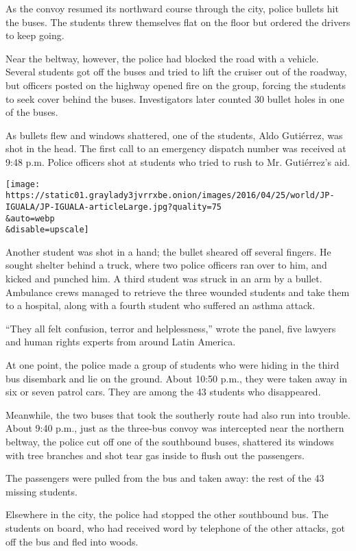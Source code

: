 As the convoy resumed its northward course through the city, police
bullets hit the buses. The students threw themselves flat on the floor
but ordered the drivers to keep going.

Near the beltway, however, the police had blocked the road with a
vehicle. Several students got off the buses and tried to lift the
cruiser out of the roadway, but officers posted on the highway opened
fire on the group, forcing the students to seek cover behind the buses.
Investigators later counted 30 bullet holes in one of the buses.

As bullets flew and windows shattered, one of the students, Aldo
Gutiérrez, was shot in the head. The first call to an emergency dispatch
number was received at 9:48 p.m. Police officers shot at students who
tried to rush to Mr. Gutiérrez's aid.

\texttt{[image: https://static01.graylady3jvrrxbe.onion/images/2016/04/25/world/JP-IGUALA/JP-IGUALA-articleLarge.jpg?quality=75\\\&auto=webp\\\&disable=upscale]}

Another student was shot in a hand; the bullet sheared off several
fingers. He sought shelter behind a truck, where two police officers ran
over to him, and kicked and punched him. A third student was struck in
an arm by a bullet. Ambulance crews managed to retrieve the three
wounded students and take them to a hospital, along with a fourth
student who suffered an asthma attack.

``They all felt confusion, terror and helplessness,'' wrote the panel,
five lawyers and human rights experts from around Latin America.

At one point, the police made a group of students who were hiding in the
third bus disembark and lie on the ground. About 10:50 p.m., they were
taken away in six or seven patrol cars. They are among the 43 students
who disappeared.

Meanwhile, the two buses that took the southerly route had also run into
trouble. About 9:40 p.m., just as the three-bus convoy was intercepted
near the northern beltway, the police cut off one of the southbound
buses, shattered its windows with tree branches and shot tear gas inside
to flush out the passengers.

The passengers were pulled from the bus and taken away: the rest of the
43 missing students.

Elsewhere in the city, the police had stopped the other southbound bus.
The students on board, who had received word by telephone of the other
attacks, got off the bus and fled into woods.

